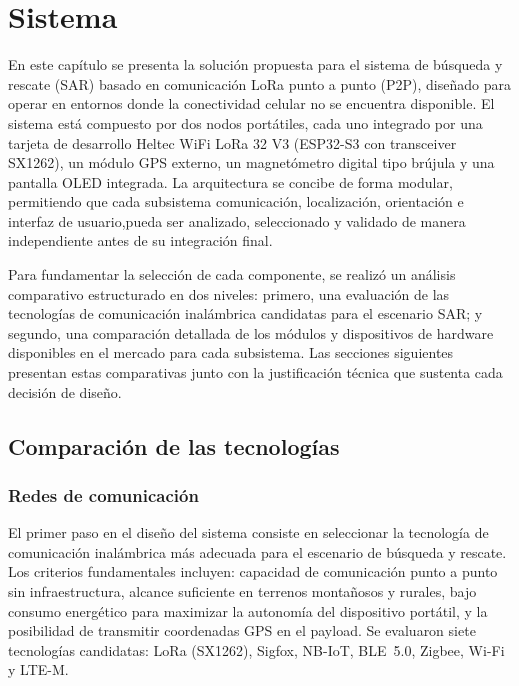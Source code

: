 \chapter{Sistema}\label{solucion}

En este capítulo se presenta la solución propuesta para el sistema de búsqueda y rescate (SAR) basado en comunicación LoRa punto a punto (P2P), diseñado para operar en entornos donde la conectividad celular no se encuentra disponible. El sistema está compuesto por dos nodos portátiles, cada uno integrado por una tarjeta de desarrollo Heltec WiFi LoRa 32 V3 (ESP32-S3 con transceiver SX1262), un módulo GPS externo, un magnetómetro digital tipo brújula y una pantalla OLED integrada. La arquitectura se concibe de forma modular, permitiendo que cada subsistema comunicación, localización, orientación e interfaz de usuario,pueda ser analizado, seleccionado y validado de manera independiente antes de su integración final.

Para fundamentar la selección de cada componente, se realizó un análisis comparativo estructurado en dos niveles: primero, una evaluación de las tecnologías de comunicación inalámbrica candidatas para el escenario SAR; y segundo, una comparación detallada de los módulos y dispositivos de hardware disponibles en el mercado para cada subsistema. Las secciones siguientes presentan estas comparativas junto con la justificación técnica que sustenta cada decisión de diseño.

\section{Comparación de las tecnologías}

\subsection{Redes de comunicación}

El primer paso en el diseño del sistema consiste en seleccionar la tecnología de comunicación inalámbrica más adecuada para el escenario de búsqueda y rescate. Los criterios fundamentales incluyen: capacidad de comunicación punto a punto sin infraestructura, alcance suficiente en terrenos montañosos y rurales, bajo consumo energético para maximizar la autonomía del dispositivo portátil, y la posibilidad de transmitir coordenadas GPS en el payload. Se evaluaron siete tecnologías candidatas: LoRa (SX1262), Sigfox, NB-IoT, BLE~5.0, Zigbee, Wi-Fi y LTE-M.

